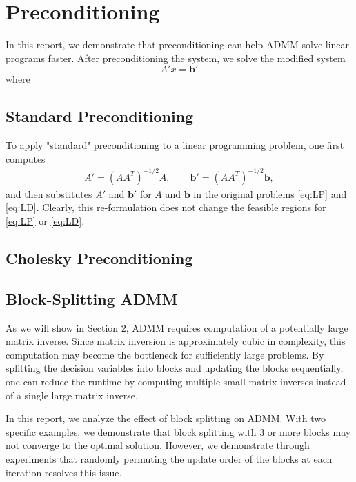 \documentclass{article}
\begin{document}
\vspace{0.1in}
\section*{Preconditioning}
In this report, we demonstrate that preconditioning can help ADMM solve linear programs faster. After preconditioning the system, we solve the modified system 
\begin{equation}
A' x = \mathbf{b}'
\end{equation}
where
\subsection*{Standard Preconditioning}
To apply "standard" preconditioning to a linear programming problem, one first computes 
\begin{align}
A' = (AA^T )^{-1/2}A , \quad \quad \mathbf{b}' =(AA^T )^{-1/2}\mathbf{b},
\end{align}
and then substitutes $A'$ and $\mathbf{b}'$ for $A$ and $\mathbf{b}$ in the original problems \eqref{eq:LP} and \eqref{eq:LD}. Clearly, this re-formulation does not change the feasible regions for  \eqref{eq:LP} or \eqref{eq:LD}. 

\subsection*{Cholesky Preconditioning}

\vspace{0.1in}
\vspace{0.1in}
\subsection*{Block-Splitting ADMM}
As we will show in Section 2, ADMM requires computation of a potentially large matrix inverse. Since matrix inversion is approximately cubic in complexity, this computation may become the bottleneck for sufficiently large problems. By splitting the decision variables into blocks and updating the blocks sequentially, one can reduce the runtime by computing multiple small matrix inverses instead of a single large matrix inverse.

In this report, we analyze the effect of block splitting on ADMM. With two specific examples, we demonstrate that block splitting with 3 or more blocks may not converge to the optimal solution. However, we demonstrate through experiments that randomly permuting the update order of the blocks at each iteration resolves this issue.
\end{document}
